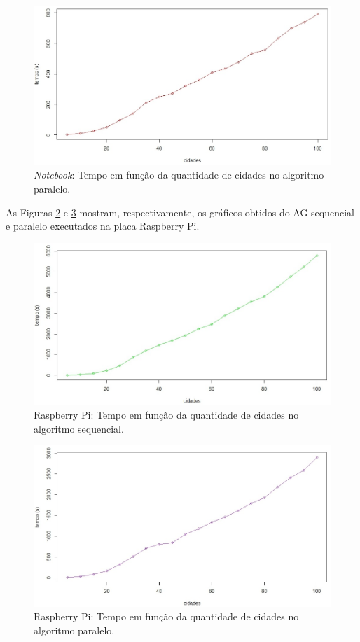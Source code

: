 \begin{figure}[htb]  
	\centering
	\includegraphics[width=.69\textwidth]{figuras/res_002_20ntp}
	\caption[\textit{Notebook}: tempo paralelo]{\textit{Notebook}: Tempo em função da quantidade de cidades no algoritmo paralelo.}
	\label{figura:res_002}
\end{figure}

As Figuras \ref{figura:res_003} e \ref{figura:res_004} mostram, respectivamente, os gráficos obtidos do AG sequencial e paralelo executados na placa Raspberry Pi.

\begin{figure}[htb]  
	\centering
	\includegraphics[width=.69\textwidth]{figuras/res_003_20rts}
	\caption[Raspberry Pi: tempo sequencial]{Raspberry Pi: Tempo em função da quantidade de cidades no algoritmo sequencial.}
	\label{figura:res_003}
\end{figure}

\begin{figure}[htb]  
	\centering
	\includegraphics[width=.69\textwidth]{figuras/res_004_20rtp}
	\caption[Raspberry Pi: tempo paralelo]{Raspberry Pi: Tempo em função da quantidade de cidades no algoritmo paralelo.}
	\label{figura:res_004}
\end{figure} 

